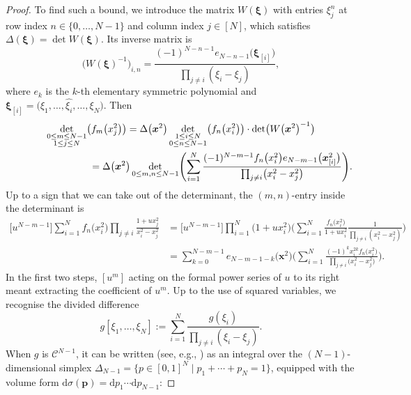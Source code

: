 \documentclass[11pt]{article}
\numberwithin{equation}{section}
\numberwithin{equation}{section}
\newcommand{\dd}{\mathrm{d}}
\begin{document}
\begin{proof}
To find such a bound, we introduce the matrix $W(\boldsymbol{\xi})$ with entries $\xi_j^{n}$ at row index $n \in \{0,\dots,N - 1\}$ and column index $j \in [N]$, which satisfies $\Delta(\boldsymbol{\xi}) = \det W(\boldsymbol{\xi})$. Its inverse matrix is
\[
\bigl(W(\boldsymbol{\xi})^{-1}\bigr)_{i,n} = \frac{(-1)^{N - n - 1}e_{N - n - 1}\bigl(\boldsymbol{\xi}_{[i]}\bigr)}{\prod_{j \neq i} (\xi_i - \xi_j)},
\]
where $e_k$ is the $k$-th elementary symmetric polynomial and $\boldsymbol{\xi}_{[i]} = \bigl(\xi_1,\dots,\widehat{\xi_i},\dots,\xi_N\bigr)$. Then
\begin{gather}
\nonumber \mathop{\det}_{\substack{0 \leq m \leq N - 1 \\ 1 \leq j \leq N }} \bigl(f_m\bigl(x_j^2\bigr)\bigr) = \Delta\bigl(\boldsymbol{x}^2\bigr) \det_{\substack{1 \leq i \leq N \\ 0 \leq n \leq N - 1}} \bigl(f_n\bigl(x_i^2\bigr)\bigr) \cdot \det \bigl(W\bigl(\boldsymbol{x}^2\bigr)^{-1}\bigr) \\
\hphantom{\mathop{\det}_{\substack{0 \leq m \leq N - 1 \\ 1 \leq j \leq N }} \bigl(f_m\bigl(x_j^2\bigr)\bigr)}{} = \Delta\bigl(\boldsymbol{x}^2\bigr) \det_{0 \leq m,n \leq N - 1} \Biggl(\sum_{i = 1}^{N} \frac{(-1)^{N - m - 1} f_n\bigl(x_i^2\bigr) e_{N - m - 1}\bigl(\boldsymbol{x}^2_{[i]}\bigr)}{\prod_{j \neq i} \bigl(x_i^2 - x_j^2\bigr)}\Biggr).\label{26}
\end{gather}
Up to a sign that we can take out of the determinant, the $(m,n)$-entry inside the determinant is
\begin{align*}
 \bigl[u^{N - m - 1}\bigr] \sum_{i = 1}^N f_n\bigl(x_i^2\bigr) \prod_{j \neq i} \frac{1 + ux_j^2}{x_i^2 - x_j^2} & = \bigl[u^{N - m - 1}\bigr] \prod_{i = 1}^N \bigl(1 + ux_i^2\bigr)\!\Biggl( \sum_{i = 1}^N \frac{f_n\bigl(x_i^2\bigr)}{1 + ux_i^2} \frac{1}{\prod_{j \neq i} (x_i^2 - x_j^2)}\Biggr) \\
& = \sum_{k = 0}^{N - m - 1} e_{N - m - 1 - k}\bigl(\boldsymbol{x}^2\bigr)\!\Biggl( \sum_{i = 1}^{N} \frac{(-1)^k x_i^{2k} f_{n}\bigl(x_i^2\bigr)}{\prod_{j \neq i} \bigl(x_i^2 - x_j^2\bigr)}\Biggr).
\end{align*}
In the first two steps, $[u^m]$ acting on the formal power series of $u$ to its right meant extracting the coefficient of $u^m$. Up to the use of squared variables, we recognise the divided difference
\[
g[\xi_1,\dots,\xi_N] := \sum_{i = 1}^N \frac{g(\xi_i)}{\prod_{j \neq i} (\xi_i - \xi_j)}.
\]
When $g$ is $\mathcal{C}^{N - 1}$, it can be written (see, e.g., \cite[Theorem 2, p.~250]{AnaN}) as an integral over the $(N - 1)$-dimensional simplex $\Delta_{N - 1} = \{p \in [0,1]^N \mid p_1 + \cdots + p_N = 1\}$, equipped with the volume form $\dd \sigma(\boldsymbol{p}) = \dd p_1 \cdots \dd p_{N - 1}$:

\end{proof}
\end{document}
